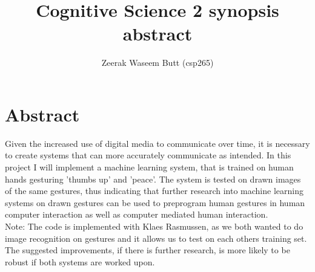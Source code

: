 \documentclass[10pt, a4paper]{article}
\begin{document}
\title{Cognitive Science 2 synopsis abstract}
\author{Zeerak Waseem Butt (csp265)}
\date{}
\maketitle
\section{Abstract}
Given the increased use of digital media to communicate over time, it is necessary to create systems that can more accurately communicate as intended. In this project I will implement a machine learning system, that is trained on human hands gesturing 'thumbs up' and 'peace'. The system is tested on drawn images of the same gestures, thus indicating that further research into machine learning systems on drawn gestures can be used to preprogram human gestures in human computer interaction as well as computer mediated human interaction.\\

Note: The code is implemented with Klaes Rasmussen, as we both wanted to do image recognition on gestures and it allows us to test on each others training set. The suggested improvements, if there is further research, is more likely to be robust if both systems are worked upon.



\nocite{*}
\end{document}
